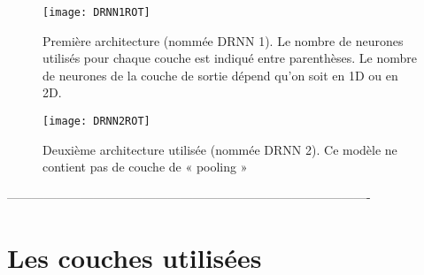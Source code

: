\clearpage
\begin{figure}[ht!]
   \begin{minipage}{0.6\textwidth}
     \centering
     \texttt{[image: DRNN1ROT]}
     \decoRule
     \caption[DRNN1]{Première architecture (nommée DRNN 1). Le nombre de neurones utilisés pour     
     chaque couche est indiqué entre parenthèses. Le nombre de neurones de la couche de sortie 
     dépend qu'on soit en 1D ou en 2D.}
     \label{fig:DRNN1}
   \end{minipage}\hfill
   \begin{minipage}{0.4\textwidth}
     \centering
     \texttt{[image: DRNN2ROT]}
     \decoRule
     \caption[DRNN2]{Deuxième architecture utilisée (nommée DRNN 2). Ce modèle ne contient pas de 
     couche de « pooling » \footnotemark }
     \label{fig:DRNN2}
   \end{minipage}
\end{figure}

% 
% 

----------------------------------------------------------------------------------------
\section{Les couches utilisées}

